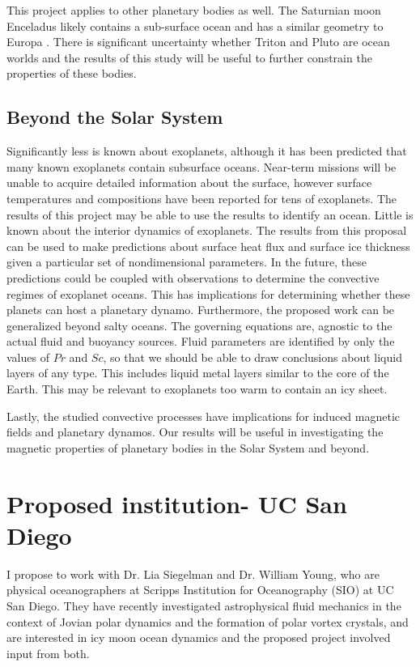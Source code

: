 \documentclass[12pt]{article}
\begin{document}
This project applies to other planetary bodies as well. The Saturnian moon Enceladus likely contains a sub-surface ocean and has a similar geometry to Europa \citep{kS24}. There is significant uncertainty whether Triton \citep{jK22} and Pluto \citep{kS24} are ocean worlds and the results of this study will be useful to further constrain the properties of these bodies. 

\subsection{Beyond the Solar System}
Significantly less is known about exoplanets, although it has been predicted that many known exoplanets contain subsurface oceans\citep{lQ20}. Near-term missions will be unable to acquire detailed information about the surface, however surface temperatures and compositions have been reported for tens of exoplanets\citep{nM19}. The results of this project may be able to use the results to identify an ocean. 
Little is known about the interior dynamics of exoplanets. The results from this proposal can be used to make predictions about surface heat flux and surface ice thickness given a particular set of nondimensional parameters. In the future, these predictions could be coupled with observations to determine the convective regimes of exoplanet oceans. This has implications for determining whether these planets can host a planetary dynamo\citep{pD11}.
Furthermore, the proposed work can be generalized beyond salty oceans. The governing equations are, agnostic to the actual fluid and buoyancy sources. Fluid parameters are identified by only the values of $Pr$ and $Sc$, so that we should be able to draw conclusions about liquid layers of any type. This includes liquid metal layers similar to the core of the Earth. This may be relevant to exoplanets too warm to contain an icy sheet.

Lastly, the studied convective processes have implications for induced magnetic fields and planetary dynamos. Our results will be useful in investigating the magnetic properties of planetary bodies in the Solar System and beyond.

\section{Proposed institution- UC San Diego}
I propose to work with Dr. Lia Siegelman and Dr. William Young, who are physical oceanographers at Scripps Institution for Oceanography (SIO) at UC San Diego. 
They have recently investigated astrophysical fluid mechanics in the context of Jovian polar dynamics and the formation of polar vortex crystals\cite{lS22,lS22b,lS24}, and are interested in icy moon ocean dynamics and the proposed project involved input from both.
\end{document}
